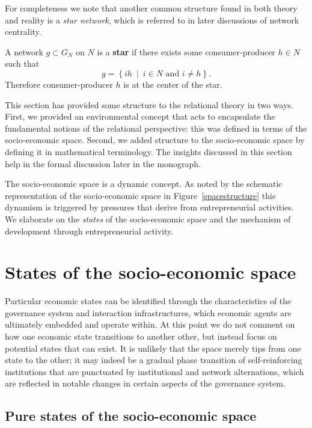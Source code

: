 For completeness we note that another common structure found in both theory and reality is a \emph{star network}, which is referred to in later discussions of network centrality.
\begin{definition} \label{def:starNetwork}
A network $g \subset G_{N}$ on $N$ is a \textbf{star} if there exists some consumer-producer $h \in N$ such that
\begin{equation}
g = \left\{ ih ~ \mid ~ i \in N \mbox{ and } i \neq h \right\}.
\end{equation}
Therefore consumer-producer $h$ is at the center of the star.
\end{definition}
This section has provided some structure to the relational theory in two ways. First, we provided an environmental concept that acts to encapsulate the fundamental notions of the relational perspective: this was defined in terms of the socio-economic space. Second, we added structure to the socio-economic space by defining it in mathematical terminology. The insights discussed in this section help in the formal discussion later in the monograph.

The socio-economic space is a dynamic concept. As noted by the schematic representation of the socio-economic space in Figure~\ref{spacestructure} this dynamism is triggered by pressures that derive from entrepreneurial activities. We elaborate on the \emph{states} of the socio-economic space and the mechanism of development through entrepreneurial activity.

\section{States of the socio-economic space}

Particular economic states can be identified through the characteristics of the governance system and interaction infrastructures, which economic agents are ultimately embedded and operate within. At this point we do not comment on how one economic state transitions to another other, but instead focus on potential states that can exist. It is unlikely that the space merely tips from one state to the other; it may indeed be a gradual phase transition of self-reinforcing institutions that are punctuated by institutional and network alternations, which are reflected in notable changes in certain aspects of the governance system.

\subsection{Pure states of the socio-economic space}

